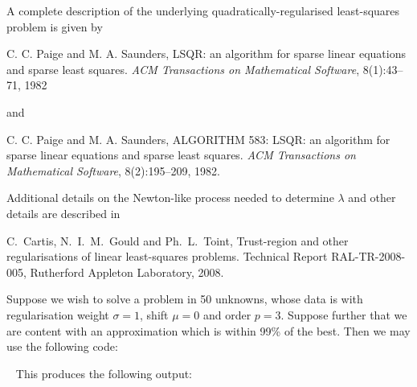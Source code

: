 \documentclass{galahad}
\begin{document}
\galreferences
A complete description of the underlying quadratically-regularised
least-squares problem is given by
\vspace*{1mm}

\noindent  
C. C. Paige and M. A. Saunders,
LSQR: an algorithm for sparse linear equations and sparse least  squares.
{\em ACM Transactions on Mathematical Software}, 8(1):43--71, 1982

\noindent  
and

\noindent  
C. C. Paige and M. A. Saunders,
ALGORITHM 583: LSQR: an algorithm for sparse linear equations and
  sparse least squares.
{\em ACM Transactions on Mathematical Software}, 8(2):195--209, 1982.

\noindent  
Additional details on the Newton-like process needed to determine $\lambda$ and
other details are described in 
\vspace*{1mm}

\noindent  
C.\ Cartis, N.\ I.\ M.\ Gould and Ph.\ L.\ Toint,
Trust-region and other regularisations of linear 
least-squares problems.
Technical Report RAL-TR-2008-005, Rutherford Appleton Laboratory, 2008.


\galexample
Suppose we wish to solve a problem in 50 unknowns, whose data is 
with regularisation weight $\sigma = 1$, shift $\mu = 0$ and order $p = 3$.
Suppose further that we are content with 
an approximation which is within 99\% of the best.
Then we may use the following code:

{\tt \small
\VerbatimInput{\packageexample}
}
\noindent
This produces the following output:
{\tt \small
\VerbatimInput{\packageresults}
}
\end{document}
